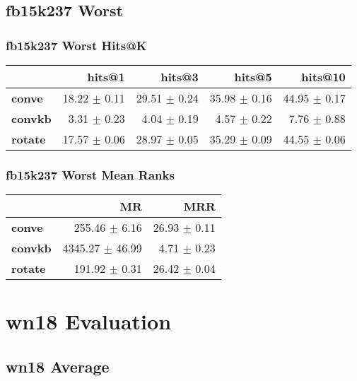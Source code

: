 \documentclass{article}
\begin{document}
\subsection{fb15k237 Worst}
\subsubsection{fb15k237 Worst Hits@K}
    \begin{center}
    \begin{tabular}{lrrrr}
\toprule
{} &        hits@1 &        hits@3 &        hits@5 &       hits@10 \\
\midrule
\textbf{conve } &  18.22 $\pm$ 0.11 &  29.51 $\pm$ 0.24 &  35.98 $\pm$ 0.16 &  44.95 $\pm$ 0.17 \\
\textbf{convkb} &   3.31 $\pm$ 0.23 &   4.04 $\pm$ 0.19 &   4.57 $\pm$ 0.22 &   7.76 $\pm$ 0.88 \\
\textbf{rotate} &  17.57 $\pm$ 0.06 &  28.97 $\pm$ 0.05 &  35.29 $\pm$ 0.09 &  44.55 $\pm$ 0.06 \\
\bottomrule
\end{tabular}

    \end{center}
\subsubsection{fb15k237 Worst Mean Ranks}
    \begin{center}
    \begin{tabular}{lrr}
\toprule
{} &               MR &           MRR \\
\midrule
\textbf{conve } &    255.46 $\pm$ 6.16 &  26.93 $\pm$ 0.11 \\
\textbf{convkb} &  4345.27 $\pm$ 46.99 &   4.71 $\pm$ 0.23 \\
\textbf{rotate} &    191.92 $\pm$ 0.31 &  26.42 $\pm$ 0.04 \\
\bottomrule
\end{tabular}

    \end{center}

\section{wn18 Evaluation}
\subsection{wn18 Average}
\end{document}
